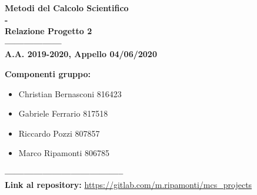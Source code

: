 \begin{center}
    {\Huge \textbf{Metodi del Calcolo Scientifico}}\\
    {\Huge \textbf{-}}\\
    {\Huge \textbf{Relazione Progetto 2}}\\
    {\Huge \textbf{------------------}}\\
    {\textbf{A.A. 2019-2020, Appello 04/06/2020}}\\
\end{center}

\vspace{4cm}

\large\textbf{Componenti gruppo:}\\
\begin{itemize}
    \item Christian Bernasconi 816423\\
    \item Gabriele Ferrario 817518\\
    \item Riccardo Pozzi 807857\\
    \item Marco Ripamonti 806785    
\end{itemize}

{\Huge \textbf{--------------------------------------}}\\
\small\textbf{Link al repository:} \url{https://gitlab.com/m.ripamonti/mcs_projects}